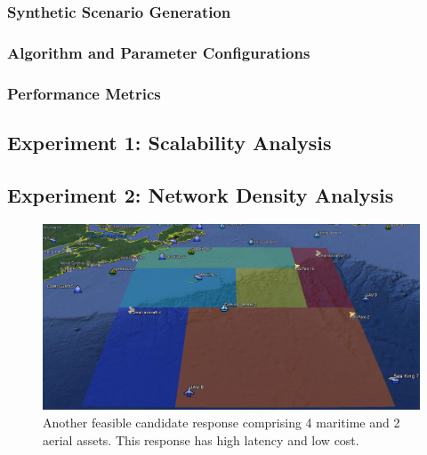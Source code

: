 \documentclass[conference]{IEEEtran}
\begin{document}
\subsubsection{Synthetic Scenario Generation}
\label{sec:Experiments:Scenarios}

\subsubsection{Algorithm and Parameter Configurations}
\label{sec:Simulations:AlgorithmsAndParameters}

\subsubsection{Performance Metrics}
\label{sec:Experiments:Metrics}

\subsection{Experiment 1: Scalability Analysis}
\label{sec:Simulations:Experiment1}

\subsection{Experiment 2: Network Density Analysis}
\label{sec:Simulations:Experiment2}


\begin{figure}[!htbp]
\centerline{\includegraphics[width=\columnwidth]{img/response2}}
\caption{Another feasible candidate response comprising 4 maritime and 2 aerial assets. This response has high latency and low cost.}
\label{fig:Response2}
\end{figure}
\end{document}
